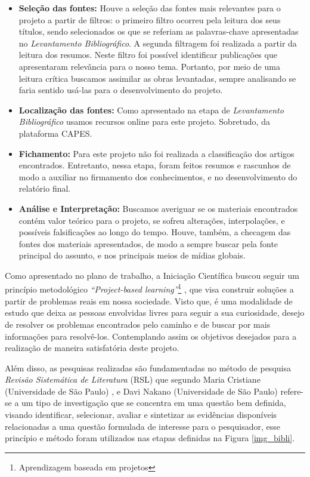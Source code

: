 \begin{itemize}
\item \textbf{Seleção das fontes:} Houve a seleção das fontes mais relevantes para o projeto a partir de filtros: o primeiro filtro ocorreu pela leitura dos seus títulos, sendo selecionados os que se referiam as palavras-chave apresentadas no \textit{Levantamento Bibliográfico}. A segunda filtragem foi realizada a partir da leitura dos resumos. Neste filtro foi possível identificar publicações que apresentaram relevância para o nosso tema.
Portanto, por meio de uma leitura crítica buscamos assimilar as obras levantadas, sempre analisando se faria sentido usá-las para o desenvolvimento do projeto. 

\item \textbf{Localização das fontes:} Como apresentado na etapa de \textit{Levantamento Bibliográfico} usamos recursos online para este projeto. Sobretudo, da plataforma CAPES.

\item \textbf{Fichamento:} Para este projeto não foi realizada a classificação dos artigos encontrados. Entretanto, nessa etapa, foram feitos resumos e rascunhos de modo a auxiliar no firmamento dos conhecimentos, e no desenvolvimento do relatório final.

\item \textbf{Análise e Interpretação:} Buscamos averiguar se os materiais encontrados contém valor teórico para o projeto, se sofreu alterações, interpolações, e possíveis falsificações ao longo do tempo. Houve, também, a checagem das fontes dos materiais apresentados, de modo a sempre buscar pela fonte principal do assunto, e nos principais meios de mídias globais.


\end{itemize}

 
Como apresentado no plano de trabalho, a Iniciação Científica buscou seguir um princípio metodológico \textit{“Project-based learning”}\footnote{Aprendizagem baseada em projetos} \cite{krajcik2006project}, que visa construir soluções a partir de problemas reais em nossa sociedade. Visto que, é uma modalidade de estudo que deixa as pessoas envolvidas livres para seguir a sua curiosidade, desejo de resolver os problemas encontrados pelo caminho e de buscar por mais informações para resolvê-los. Contemplando assim os objetivos desejados para a realização de maneira satisfatória deste projeto. 

Além disso, as pesquisas realizadas são fundamentadas no método de pesquisa \textit{Revisão Sistemática de Literatura} (RSL) que segundo Maria Cristiane (Universidade de São Paulo) \cite{revi3}, e Davi Nakano (Universidade de São Paulo) \cite{revi2} refere-se a um tipo de investigação que se concentra em uma questão bem definida, visando identificar, selecionar, avaliar e sintetizar as evidências disponíveis relacionadas a uma questão formulada de interesse para o pesquisador, esse princípio e método foram utilizados nas etapas definidas na Figura \ref{img_bibli}.

